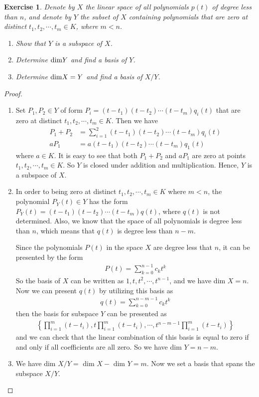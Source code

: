 \documentclass[11pt]{book}
\newtheorem{exercise}{Exercise}[section]
\theoremstyle{definition}
\numberwithin{equation}{chapter}
\begin{document}
\begin{exercise}\label{ex_4}
Denote by $X$ the linear space of all polynomials $p(t)$ of degree less than $n$, and denote by $Y$ the subset of $X$ containing polynomials that are zero at distinct $t_1,t_2,\cdots,t_m\in K$, where $m < n$.
\begin{enumerate}[label=(\alph*)]
    \item Show that $Y$ is a subspace of $X$.
    \item Determine ${\rm dim}Y$ and find a basis of $Y$.
    \item Determine ${\rm dim}X = Y$ and find a basis of $X/Y$.
\end{enumerate}
\end{exercise}
\begin{proof}
~\begin{enumerate}[label=(\alph*)]
    \item Set $P_1, P_2 \in Y$ of form $P_i = (t-t_1)(t-t_2) \cdots (t-t_m)q_i(t)$ that are zero at distinct $t_1, t_2, \cdots, t_m\in K$. Then we have 
    \begin{align*}
        P_1 + P_2 &= \sum^2_{i=1}(t-t_1)(t-t_2) \cdots (t-t_m)q_i(t) \\
        a P_1 &= a (t-t_1)(t-t_2) \cdots (t-t_m)q_1(t)
    \end{align*}
    where $a \in K$. It is easy to see that both $P_1 + P_2$ and $a P_1$ are zero at points $t_1, t_2, \cdots, t_m\in K$. So $Y$ is closed under addition and multiplication. Hence, $Y$ is a subspace of $X$.
    \item In order to being zero at distinct $t_1, t_2, \cdots, t_m\in K$ where $m < n$, the polynomial $P_Y(t) \in Y$ has the form $P_Y(t) = (t-t_1)(t-t_2) \cdots (t-t_m)q(t)$, where $q(t)$ is not determined. Also, we know that the space of all polynomials is degree less than $n$, which means that $q(t)$ is degree less than $n-m$.
    
    Since the polynomials $P(t)$ in the space $X$ are degree less that $n$, it can be presented by the form
    \begin{align*}
        P(t) = \sum^{n-1}_{k=0} c_k t^k
    \end{align*}
    So the basis of $X$ can be written as ${1, t, t^2,\cdots, t^{n-1}}$, and we have dim $X = n$. Now we can present $q(t)$ by utilizing this basis as 
    \begin{align*}
        q(t) = \sum^{n-m-1}_{k=0} c_k t^k
    \end{align*}
    then the basis for subspace $Y$ can be presented as
    \begin{align*}
        \left\{ \prod^m_{i=1}(t-t_i), t\prod^m_{i=1}(t-t_i),\cdots, t^{n-m-1}\prod^m_{i=1}(t-t_i) \right\}
    \end{align*}
    and we can check that the linear combination of this basis is equal to zero if and only if all coefficients are all zero. So we have dim $Y = n-m$.
    \item We have dim $X/Y =$ dim $X -$ dim $Y = m$. Now we set a basis that spans the subspace $X/Y$.
    

\end{enumerate}
\end{proof}
\end{document}

